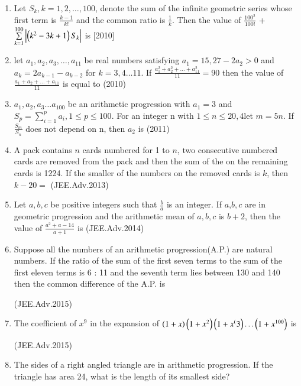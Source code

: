 \documentclass[journal,12pt,twocolumn]{IEEEtran}
\theoremstyle{remark}
\begin{document}
\begin{enumerate}
    

	\item Let $S_{k}, k = 1,2, \dots , 100$, denote the sum of the infinite geometric series whose first term is  $\frac{k - 1}{k!}$ and the common ratio is $\frac{1}{k}$. Then the value of $\frac{100^{2}}{100!}$ + $\sum\limits_{k=1}^{100} \left\vert\left(k^{2} - 3k +1\right)S_{k}\right\vert $ is \hfill[2010]

\item let $a_{1},a_{2},a_{3},\dots , a_{11}$ be real numbers satisfying $a_{1}= 15, 27 - 2a_{2} > 0$ and $a_{k}=2a_{k-1} - a_{k-2}$ for $k=3,4 \dots 11$. If $\frac{a_{1}^{2} + a_{2}^{2} + \dots +a_{11}^{2}}{11} = 90$ then the value of $\frac{a_{1} + a_{2} +\dots +a_{11}}{11}$ is equal to \hfill(2010)

\item $a_{1}, a_{2}, a_{3}\dots a_{100}$ be an arithmetic progression with $a_{1}= 3$ and $S_{p} =\sum\limits_{i=1}^{p} a_{i},1\leq p\leq 100$. For an integer n with $1 \leq n \leq 20,4$let $m= 5n$. If $\frac{S_{m}}{S_{n}}$ does not depend on n, then $a_{2}$ is \hfill(2011)

   \item A pack contains $n$ cards numbered for 1 to $n$, two consecutive numbered cards are removed from the pack and then the sum of the on the remaining cards is 1224. If the smaller of the numbers on the removed cards is $k$, then $k - 20=$ \hfill(JEE.Adv.2013)

   \item Let $a,b,c$ be positive integers such that $\frac{b}{a}$ is an integer. If $a$,$b,c$ are in geometric progression and the arithmetic mean of $a,b,c$ is $b + 2$, then the value of $\frac{a^{2} + a - 14}{a + 1}$ is \hfill(JEE.Adv.2014)

   \item Suppose all the numbers of an arithmetic progression(A.P.) are natural numbers. If the ratio of the sum of the first seven terms to the sum of the first eleven terms is 6 : 11 and the seventh term lies between 130 and 140 then the common difference of the A.P. is 
   
    \hfill(JEE.Adv.2015)

   \item The coefficient of $x^{9}$ in the expansion of $\left(1+x\right)\left(1+x^{2}\right)\left(1+x^({3}\right) \dots \left(1+x^{100}\right) $ is 
   
   \hfill(JEE.Adv.2015)

   \item The sides of a right angled triangle are in arithmetic progression. If the triangle has area 24, what is the length of its smallest side? 
   

\end{enumerate}
\end{document}
